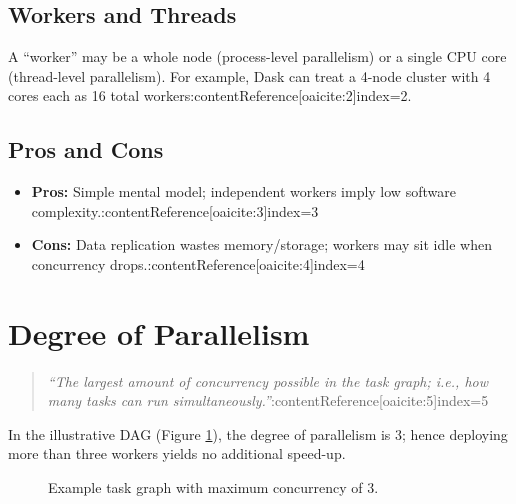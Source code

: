 \documentclass[11pt]{article}
\begin{document}
\subsection{Workers and Threads}

A “worker” may be a whole node (process-level parallelism) or a single CPU core (thread-level parallelism).  For example, Dask can treat a 4-node cluster with 4 cores each as 16 total workers:contentReference[oaicite:2]{index=2}.

\subsection{Pros and Cons}

\begin{itemize}[itemsep=0pt]
  \item \textbf{Pros:} Simple mental model; independent workers imply low software complexity.:contentReference[oaicite:3]{index=3}
  \item \textbf{Cons:} Data replication wastes memory/storage; workers may sit idle when concurrency drops.:contentReference[oaicite:4]{index=4}
\end{itemize}

\section{Degree of Parallelism}

\begin{quote}
\emph{“The largest amount of concurrency possible in the task graph; i.e., how many tasks can run simultaneously.”}:contentReference[oaicite:5]{index=5}
\end{quote}

In the illustrative DAG (Figure \ref{fig:dag}), the degree of parallelism is 3; hence deploying more than three workers yields no additional speed-up.

\begin{figure}[h]
  \centering
  \caption{Example task graph with maximum concurrency of 3.}
  \label{fig:dag}
\end{figure}
\end{document}
